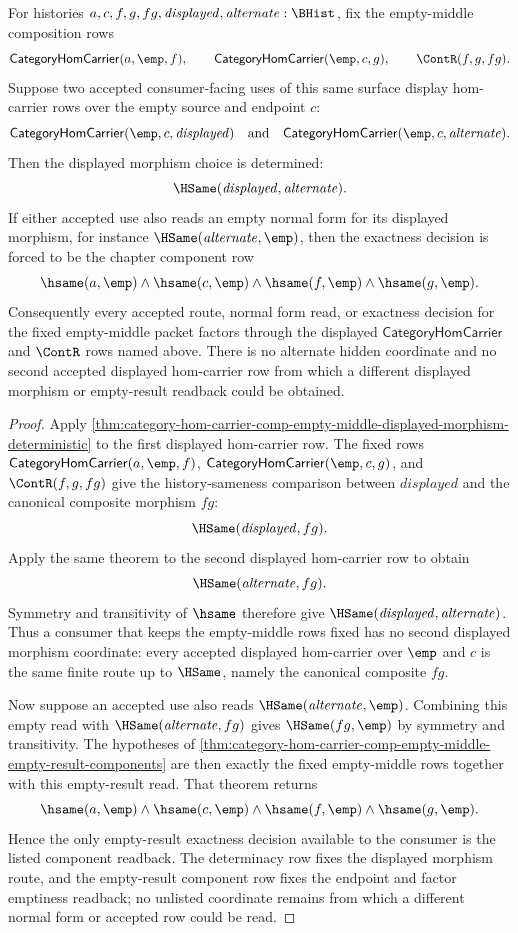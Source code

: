 \begin{corollary}
\label{cor:category-hom-carrier-comp-empty-middle-displayed-morphism-consumer-determinacy}
For histories $a,c,f,g,fg,\mathit{displayed},\mathit{alternate}:\BHist$, fix the empty-middle
composition rows
$$
\mathsf{CategoryHomCarrier}(a,\emp,f),\qquad
\mathsf{CategoryHomCarrier}(\emp,c,g),\qquad
\ContR(f,g,fg).
$$
Suppose two accepted consumer-facing uses of this same surface display
hom-carrier rows over the empty source and endpoint $c$:
$$
\mathsf{CategoryHomCarrier}(\emp,c,\mathit{displayed})
\quad\text{and}\quad
\mathsf{CategoryHomCarrier}(\emp,c,\mathit{alternate}).
$$
Then the displayed morphism choice is determined:
$$
\HSame(\mathit{displayed},\mathit{alternate}).
$$
If either accepted use also reads an empty normal form for its displayed
morphism, for instance $\HSame(\mathit{alternate},\emp)$, then the exactness decision is
forced to be the chapter component row
$$
\hsame(a,\emp)\wedge\hsame(c,\emp)\wedge
\hsame(f,\emp)\wedge\hsame(g,\emp).
$$
Consequently every accepted route, normal form read, or exactness decision for
the fixed empty-middle packet factors through the displayed $\mathsf{CategoryHomCarrier}$
and $\ContR$ rows named above. There is no alternate hidden coordinate and no
second accepted displayed hom-carrier row from which a different displayed
morphism or empty-result readback could be obtained.
\end{corollary}
\begin{proof}
Apply
\autoref{thm:category-hom-carrier-comp-empty-middle-displayed-morphism-deterministic}
to the first displayed hom-carrier row. The fixed rows
$\mathsf{CategoryHomCarrier}(a,\emp,f)$,
$\mathsf{CategoryHomCarrier}(\emp,c,g)$, and $\ContR(f,g,fg)$ give the
history-sameness comparison between $\mathit{displayed}$ and the canonical composite
morphism $fg$:
$$
\HSame(\mathit{displayed},fg).
$$
Apply the same theorem to the second displayed hom-carrier row to obtain
$$
\HSame(\mathit{alternate},fg).
$$
Symmetry and transitivity of $\hsame$ therefore give
$\HSame(\mathit{displayed},\mathit{alternate})$. Thus a consumer that keeps the empty-middle
rows fixed has no second displayed morphism coordinate: every accepted displayed
hom-carrier over $\emp$ and $c$ is the same finite route up to $\HSame$, namely
the canonical composite $fg$.

Now suppose an accepted use also reads $\HSame(\mathit{alternate},\emp)$. Combining this
empty read with $\HSame(\mathit{alternate},fg)$ gives $\HSame(fg,\emp)$ by symmetry and
transitivity. The hypotheses of
\autoref{thm:category-hom-carrier-comp-empty-middle-empty-result-components}
are then exactly the fixed empty-middle rows together with this empty-result
read. That theorem returns
$$
\hsame(a,\emp)\wedge\hsame(c,\emp)\wedge
\hsame(f,\emp)\wedge\hsame(g,\emp).
$$
Hence the only empty-result exactness decision available to the consumer is the
listed component readback. The determinacy row fixes the displayed morphism
route, and the empty-result component row fixes the endpoint and factor
emptiness readback; no unlisted coordinate remains from which a different
normal form or accepted row could be read.
\end{proof}

